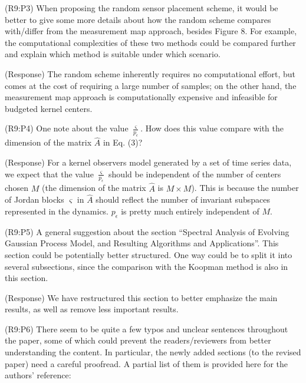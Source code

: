 \documentclass{letter}
\begin{document}
{\color{red}(R9:P3)} When proposing the random sensor placement scheme, it would be better to give some more details about how the random scheme compares with/differ from the measurement map approach, besides Figure 8. For example, the computational complexities of these two methods could be compared further and explain which method is suitable under which scenario.

{\color{red}(Response)}  The random scheme inherently requires no computational effort, but comes at the cost of requiring a large number of samples; on the other hand, the measurement map approach is computationally expensive and infeasible for budgeted kernel centers. 

{\color{red}(R9:P4)} One note about the value $\frac{\varsigma}{p_{\epsilon}}$. How does this value compare with the dimension of the matrix $\hat{A}$ in Eq. (3)?

{\color{red}(Response)} For a kernel observers model generated by a set of time series data, we expect that the value $\frac{\varsigma}{p_{\epsilon}}$ should be independent of the number of centers chosen $M$ (the dimension of the matrix $\hat A$ is $M\times M$). This is because the number of Jordan blocks $\varsigma$ in $\hat A$ should reflect the number of invariant subspaces represented in the dynamics. $p_{\epsilon}$ is pretty much entirely independent of $M$.

{\color{red}(R9:P5)} A general suggestion about the section “Spectral Analysis of Evolving Gaussian Process Model, and Resulting Algorithms and Applications”. This section could be potentially better structured. One way could be to split it into several subsections, since the comparison with the Koopman method is also in this section.

{\color{red}(Response)} We have restructured this section to better emphasize the main results, as well as remove less important results.

{\color{red}(R9:P6)} There seem to be quite a few typos and unclear sentences throughout the paper, some of which could prevent the readers/reviewers from better
understanding the content. In particular, the newly added sections (to the revised paper) need a careful proofread. A partial list of them is
provided here for the authors’ reference: 
\end{document}
